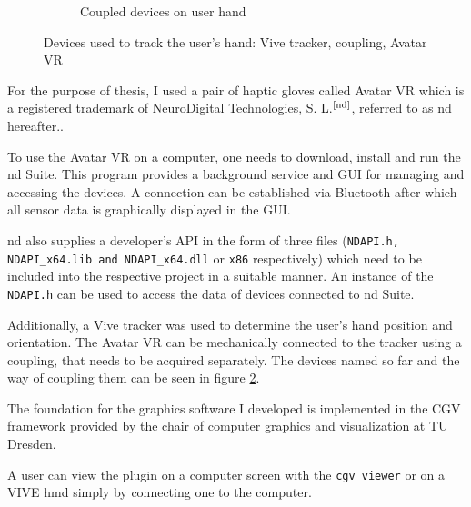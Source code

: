 \documentclass[hyperref, bachelorofscience]{cgvpub}
\newcommand{\newcite}[1]{$ ^{\text{\cite{#1}}} $}
\begin{document}
\begin{figure}
\begin{subfigure}{.49\linewidth}
		\caption{Coupled devices on user hand}
		\label{fig:devices:cou}
	\end{subfigure}
	\caption[Devices used to track the user's hand]{Devices used to track the user's hand: Vive tracker, coupling, Avatar VR}
	\label{fig:devices}
\end{figure}

For the purpose of thesis, I used a pair of haptic gloves called Avatar VR which is a registered trademark of NeuroDigital Technologies, S. L.\newcite{nd}, referred to as \acrshort{nd} hereafter..

To use the Avatar VR on a computer, one needs to download, install and run the \acrshort{nd} Suite. This program provides a background service and GUI for managing and accessing the devices. A connection can be established via Bluetooth after which all sensor data is graphically displayed in the GUI.

\acrshort{nd} also supplies a developer's API in the form of three files (\lstinline|NDAPI.h, NDAPI_x64.lib and NDAPI_x64.dll| or \lstinline|x86| respectively) which need to be included into the respective project in a suitable manner. An instance of the \lstinline|NDAPI.h| can be used to access the data of devices connected to \acrshort{nd} Suite.

Additionally, a Vive tracker was used to determine the user's hand position and orientation. The Avatar VR can be mechanically connected to the tracker using a coupling, that needs to be acquired separately. The devices named so far and the way of coupling them can be seen in figure \ref{fig:devices}.

The foundation for the graphics software I developed is implemented in the \gls{CGV} framework provided by the chair of computer graphics and visualization at TU Dresden.

A user can view the plugin on a computer screen with the \lstinline|cgv_viewer| or on a \Gls{VIVE} \acrfull{hmd} simply by connecting one to the computer.
\end{document}
